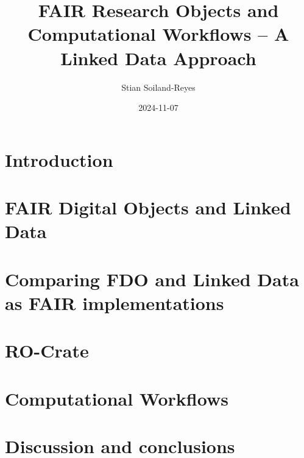 \documentclass[british,a4paper]{book}
\title{FAIR Research Objects and Computational Workflows – A Linked Data Approach}
\author{Stian Soiland-Reyes}
\date{2024-11-07}
\begin{document}
\frontmatter







\printglossaries



\mainmatter
\fancyhead[RO]{\leftmark}

\chapter{Introduction}
\label{chapter:introduction}






\chapter{FAIR Digital Objects and Linked Data}
\label{chapter:background}


\chapter{Comparing FDO and Linked Data as FAIR implementations}
\label{chapter:fdo}




\chapter{RO-Crate}
\label{chapter:ro-crate}





\chapter{Computational Workflows}
\label{chapter:workflows}







\chapter{Discussion and conclusions}
\label{chapter:conclusions}


\end{document}
